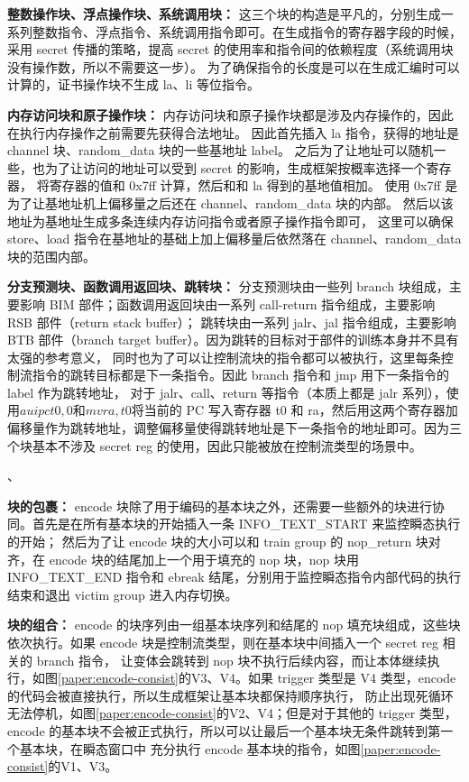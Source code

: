 \textbf{整数操作块、浮点操作块、系统调用块：}
这三个块的构造是平凡的，分别生成一系列整数指令、浮点指令、系统调用指令即可。在生成指令的寄存器字段的时候，
采用 secret 传播的策略，提高 secret 的使用率和指令间的依赖程度（系统调用块没有操作数，所以不需要这一步）。
为了确保指令的长度是可以在生成汇编时可以计算的，证书操作块不生成 la、li 等位指令。\par

\textbf{内存访问块和原子操作块：}
内存访问块和原子操作块都是涉及内存操作的，因此在执行内存操作之前需要先获得合法地址。
因此首先插入 la 指令，获得的地址是 channel 块、random\_data 块的一些基地址 label。
之后为了让地址可以随机一些，也为了让访问的地址可以受到 secret 的影响，生成框架按概率选择一个寄存器，
将寄存器的值和 0x7ff 计算，然后和和 la 得到的基地值相加。
使用 0x7ff 是为了让基地址机上偏移量之后还在 channel、random\_data 块的内部。
然后以该地址为基地址生成多条连续内存访问指令或者原子操作指令即可，
这里可以确保 store、load 指令在基地址的基础上加上偏移量后依然落在 channel、random\_data 块的范围内部。\par

\textbf{分支预测块、函数调用返回块、跳转块：}
分支预测块由一些列 branch 块组成，主要影响 BIM 部件；函数调用返回块由一系列 call-return 指令组成，主要影响 RSB 部件（return stack buffer）；
跳转块由一系列 jalr、jal 指令组成，主要影响 BTB 部件（branch target buffer）。因为跳转的目标对于部件的训练本身并不具有太强的参考意义，
同时也为了可以让控制流块的指令都可以被执行，这里每条控制流指令的跳转目标都是下一条指令。因此 branch 指令和 jmp 用下一条指令的 label 作为跳转地址，
对于 jalr、call、return 等指令（本质上都是 jalr 系列），使用$auipc t0, 0 和 mv ra, t0$将当前的 PC 写入寄存器 t0 和 ra，然后用这两个寄存器加
偏移量作为跳转地址，调整偏移量使得跳转地址是下一条指令的地址即可。因为三个块基本不涉及 secret reg 的使用，因此只能被放在控制流类型的场景中。\par、

\textbf{块的包裹：}
encode 块除了用于编码的基本块之外，还需要一些额外的块进行协同。首先是在所有基本块的开始插入一条 INFO\_TEXT\_START 来监控瞬态执行的开始；
然后为了让 encode 块的大小可以和 train group 的 nop\_return 块对齐，在 encode 块的结尾加上一个用于填充的 nop 块，nop 块用 INFO\_TEXT\_END 指令和
ebreak 结尾，分别用于监控瞬态指令内部代码的执行结束和退出 victim group 进入内存切换。\par

\textbf{块的组合：}
encode 的块序列由一组基本块序列和结尾的 nop 填充块组成，这些块依次执行。如果 encode 块是控制流类型，则在基本块中间插入一个 secret reg 相关的 branch 指令，
让变体会跳转到 nop 块不执行后续内容，而让本体继续执行，如图\ref{paper:encode-consist}的V3、V4。如果 trigger 类型是 V4 类型，encode 的代码会被直接执行，所以生成框架让基本块都保持顺序执行，
防止出现死循环无法停机，如图\ref{paper:encode-consist}的V2、V4；但是对于其他的 trigger 类型，encode 的基本块不会被正式执行，所以可以让最后一个基本块无条件跳转到第一个基本块，在瞬态窗口中
充分执行 encode 基本块的指令，如图\ref{paper:encode-consist}的V1、V3。\par

